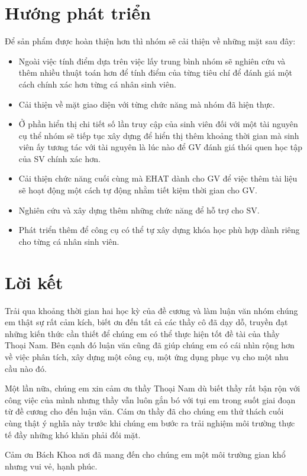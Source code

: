 \section{Hướng phát triển}

Để sản phẩm được hoàn thiện hơn thì nhóm sẽ cải thiện về những mặt sau đây:

\begin{itemize}
	\item Ngoài việc tính điểm dựa trên việc lấy trung bình nhóm sẽ nghiên cứu và thêm nhiều thuật toán hơn để tính điểm của từng tiêu chí để đánh giá một cách chính xác hơn từng cá nhân sinh viên.
	
	\item Cải thiện về mặt giao diện với từng chức năng mà nhóm đã hiện thực.
	
	\item Ở phần hiển thị chi tiết số lần truy cập của sinh viên đối với một tài nguyên cụ thể nhóm sẽ tiếp tục xây dựng để hiển thị thêm khoảng thời gian mà sinh viên ấy tương tác với tài nguyên là lúc nào để GV đánh giá thói quen học tập của SV chính xác hơn.
	
	\item Cải thiện chức năng cuối cùng mà EHAT dành cho GV để việc thêm tài liệu sẽ hoạt động một cách tự động nhằm tiết kiệm thời gian cho GV.
	
	\item Nghiên cứu và xây dựng thêm những chức năng để hỗ trợ cho SV.
	
	\item Phát triển thêm để công cụ có thể tự xây dựng khóa học phù hợp dành riêng cho từng cá nhân sinh viên.
\end{itemize}

\section{Lời kết}

Trải qua khoảng thời gian hai học kỳ của đề cương và làm luận văn nhóm chúng em thật sự rất cảm kích, biết ơn đến tất cả các thầy cô đã dạy dỗ, truyền đạt những kiến thức cần thiết để chúng em có thể thực hiện tốt đề tài của thầy Thoại Nam. Bên cạnh đó luận văn cũng đã giúp chúng em có cái nhìn rộng hơn về việc phân tích, xây dựng một công cụ, một ứng dụng phục vụ cho một nhu cầu nào đó. 

Một lần nữa, chúng em xin cảm ơn thầy Thoại Nam dù biết thầy rất bận rộn với công việc của mình nhưng thầy vẫn luôn gắn bó với tụi em trong suốt giai đoạn từ đề cương cho đến luận văn. Cám ơn thầy đã cho chúng em thử thách cuối cùng thật ý nghĩa này trước khi chúng em bước ra trải nghiệm môi trường thực tế đầy những khó khăn phải đối mặt. 

Cảm ơn Bách Khoa nơi đã mang đến cho chúng em một môi trường gian khổ nhưng vui vẻ, hạnh phúc.